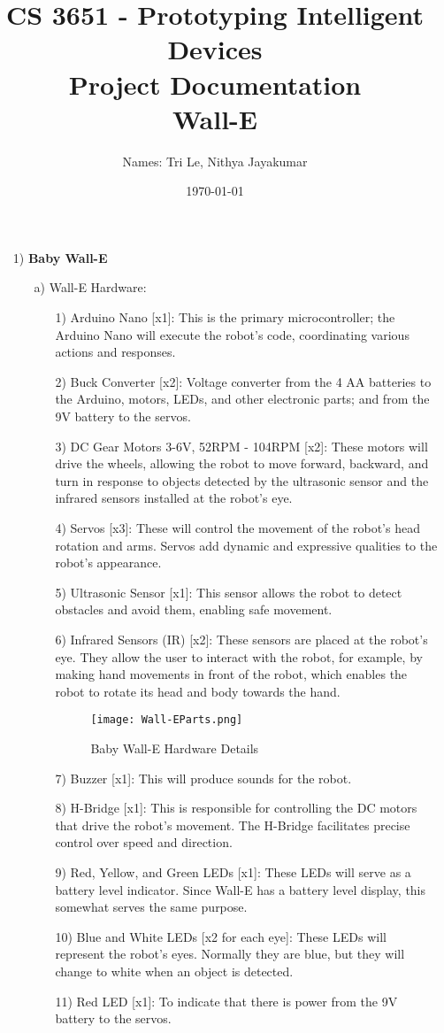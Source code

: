\documentclass[12pt]{article}
\title{CS 3651 - Prototyping Intelligent Devices\\ Project Documentation\\Wall-E}
\author{Names: Tri Le, Nithya Jayakumar}
\date{\today}
\begin{document}
\maketitle

\newpage
\begin{itemize}
    \item[1)] \textbf{Baby Wall-E}
    \begin{itemize}
        \item[a)] Wall-E Hardware:
        \begin{itemize}
            \item[1)] Arduino Nano [x1]: This is the primary microcontroller; the Arduino Nano will execute the robot’s code, coordinating various actions and responses.
            \item[2)] Buck Converter [x2]: Voltage converter from the 4 AA batteries to the Arduino, motors, LEDs, and other electronic parts; and from the 9V battery to the servos.
            \item[3)] DC Gear Motors 3-6V, 52RPM - 104RPM [x2]: These motors will drive the wheels, allowing the robot to move forward, backward, and turn in response to objects detected by the ultrasonic sensor and the infrared sensors installed at the robot's eye.
            \item[4)] Servos [x3]: These will control the movement of the robot’s head rotation and arms. Servos add dynamic and expressive qualities to the robot’s appearance.
            \item[5)] Ultrasonic Sensor [x1]: This sensor allows the robot to detect obstacles and avoid them, enabling safe movement.
            \item[6)] Infrared Sensors (IR) [x2]: These sensors are placed at the robot's eye. They allow the user to interact with the robot, for example, by making hand movements in front of the robot, which enables the robot to rotate its head and body towards the hand.
            \begin{figure}[H]
                \centering
                \texttt{[image: Wall-EParts.png]}
                \caption{Baby Wall-E Hardware Details}
                \label{fig:enter-label}
            \end{figure}
            \item[7)] Buzzer [x1]: This will produce sounds for the robot.
            \item[8)] H-Bridge [x1]: This is responsible for controlling the DC motors that drive the robot’s movement. The H-Bridge facilitates precise control over speed and direction.
            \item[9)] Red, Yellow, and Green LEDs [x1]: These LEDs will serve as a battery level indicator. Since Wall-E has a battery level display, this somewhat serves the same purpose.
            \item[10)] Blue and White LEDs [x2 for each eye]: These LEDs will represent the robot's eyes. Normally they are blue, but they will change to white when an object is detected.
            \item[11)] Red LED [x1]: To indicate that there is power from the 9V battery to the servos.
        \end{itemize}
        

\end{itemize}
\end{itemize}
\end{document}
